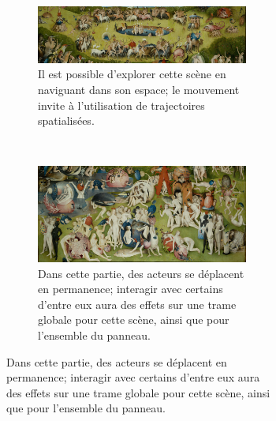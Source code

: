 \begin{landscape}
\begin{figure}
\begin{subfigure}[t]{0.7\textwidth}
\begin{subfigure}[t]{\textwidth}
            \end{subfigure}~\\           
            \begin{subfigure}[t]{\textwidth}\vskip 0pt
                \centering
                \includegraphics[width=\textwidth]{images/B2.png}
                \caption{Il est possible d'explorer cette scène en naviguant dans son espace; le mouvement invite à l'utilisation de trajectoires spatialisées.}
                \label{fig.b2}
            \end{subfigure}~\\          
            \begin{subfigure}[t]{\textwidth}\vskip 0pt
                \centering
                \includegraphics[width=\textwidth]{images/B3.png}
                \caption{Dans cette partie, des acteurs se déplacent en permanence; interagir avec certains d'entre eux aura des effets sur une trame globale pour cette scène, ainsi que pour l'ensemble du panneau.}
                \label{fig.b3}
            \end{subfigure}  
            \label{fig.b}
        \end{subfigure}\hspace{1cm}
        \begin{subfigure}[t]{0.3\textwidth}\vskip 0pt
            \centering
        \begin{subfigure}[t]{\textwidth}\vskip 0pt
            \centering

\end{subfigure}
\end{subfigure}
\end{figure}
\end{landscape}
